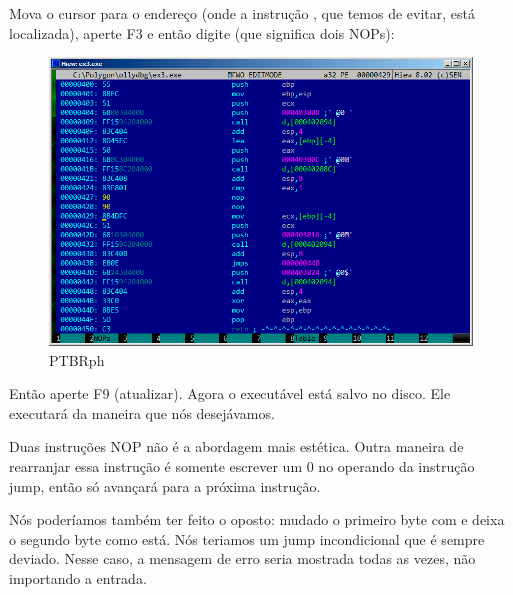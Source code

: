 \clearpage
Mova o cursor para o endereço  (onde a instrução , que temos de evitar, está localizada), aperte F3 e então digite  (que significa dois \ac{NOP}s):

\begin{figure}[H]
\centering
\includegraphics[scale=\FigScale]{patterns/04_scanf/3_checking_retval/hiew_2.png}
\caption{PTBRph{}}
\label{fig:scanf_ex3_hiew_2}
\end{figure}

Então aperte F9 (atualizar). Agora o executável está salvo no disco. Ele executará da maneira que nós desejávamos.

Duas instruções \ac{NOP} não é a abordagem mais estética.
Outra maneira de rearranjar essa instrução é somente escrever um 0 no operando da instrução jump,
então  só avançará para a próxima instrução.

Nós poderíamos também ter feito o oposto: mudado o primeiro byte com  e deixa o segundo byte como está.
Nós teriamos um jump incondicional que é sempre deviado.
Nesse caso, a mensagem de erro seria mostrada todas as vezes, não importando a entrada.

